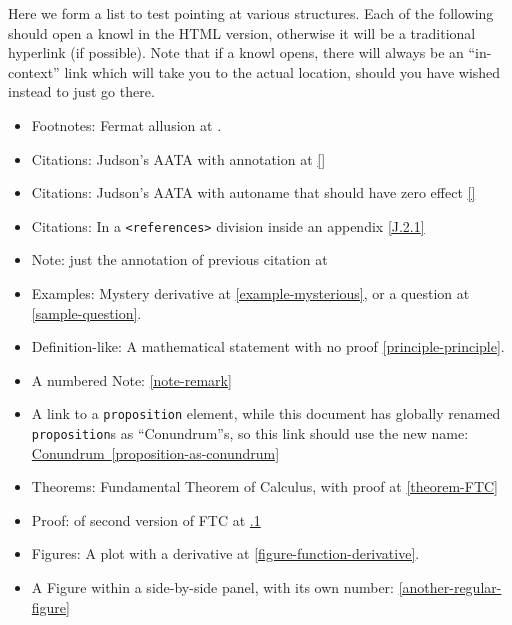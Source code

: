 \documentclass{amsart}
\theoremstyle{plain}%
\theoremstyle{definition}%
\theoremstyle{remark}%
\newcommand{\xreffont}{\relax}
\newcommand{\mono}[1]{\texttt{#1}}
\numberwithin{equation}{section}
\begin{document}
Here we form a list to test pointing at various structures.  Each of the following should open a knowl in the HTML version, otherwise it will be a traditional hyperlink (if possible).  Note that if a knowl opens, there will always be an ``in-context'' link which will take you to the actual location, should you have  wished instead to just go there.%
\begin{itemize}[label=\textbullet]
\item{}Footnotes: Fermat allusion at \hyperref[footnote-fermat]{{\xreffont 2.1}}.%
\item{}Citations: Judson's AATA with annotation at \hyperlink{biblio-judson-AATA}{[{\xreffont 1}]}%
\item{}Citations: Judson's AATA with autoname that should have zero effect \hyperlink{biblio-judson-AATA}{[{\xreffont 1}]}%
\item{}Citations: In a \mono{<references>} division inside an appendix \hyperlink{biblio-strang-article-uno}{[{\xreffont J.2.1}]}%
\item{}Note: just the annotation of previous citation at \hyperlink{note-judson-AATA}{{\xreffont 1.1}}%
\item{}Examples: Mystery derivative at \hyperref[example-mysterious]{{\xreffont\ref{example-mysterious}}}, or a question at \hyperref[sample-question]{{\xreffont\ref{sample-question}}}.%
\item{}Definition-like: A mathematical statement with no proof \hyperref[principle-principle]{{\xreffont\ref{principle-principle}}}.%
\item{}A numbered Note: \hyperref[note-remark]{{\xreffont\ref{note-remark}}}%
\item{}A link to a \mono{proposition} element, while this document has globally renamed \mono{proposition}s as ``Conundrum''s, so this link should use the new name: \hyperref[proposition-as-conundrum]{Conundrum~{\xreffont\ref{proposition-as-conundrum}}}%
\item{}Theorems: Fundamental Theorem of Calculus, with proof at \hyperref[theorem-FTC]{{\xreffont\ref{theorem-FTC}}}%
\item{}Proof: of second version of FTC at \hyperlink{proof-FTC-corollary}{{\xreffont 4.1.1}}%
\item{}Figures: A plot with a derivative at \hyperref[figure-function-derivative]{{\xreffont\ref{figure-function-derivative}}}.%
\item{}A Figure within a side-by-side panel, with its own number: \hyperref[another-regular-figure]{{\xreffont\ref{another-regular-figure}}}%

\end{itemize}
\end{document}
